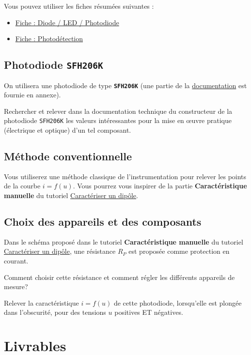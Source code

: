 Vous pouvez utiliser les fiches résumées suivantes : 

\begin{itemize}
	\item \hyperref[fiche:Led]{Fiche : Diode / LED / Photodiode}
	\item \hyperref[fiche:Photodetect]{Fiche : Photodétection}
\end{itemize}


\subsection{Photodiode \texttt{SFH206K}}

On utilisera une photodiode de type \textbf{\texttt{SFH206K}} (une partie de la \hyperref[doc:phdSFH206K]{documentation} est fournie en annexe).

\Quest Rechercher et relever dans la documentation technique du constructeur de la photodiode \texttt{SFH206K} les valeurs intéressantes pour la mise en \oe{}uvre pratique (électrique et optique) d'un tel composant.


\subsection{Méthode conventionnelle}

Vous utiliserez une méthode classique de l'instrumentation pour relever les points de la courbe $i = f(u)$. Vous pourrez vous inspirer de la partie \textbf{Caractéristique manuelle} du tutoriel \hyperref[ressource:CaracStat]{Caractériser un dipôle}.

\subsection{Choix des appareils et des composants}

Dans le schéma proposé dans le tutoriel \textbf{Caractéristique manuelle} du tutoriel \hyperref[ressource:CaracStat]{Caractériser un dipôle}, une résistance $R_P$ est proposée comme protection en courant.

\Quest Comment choisir cette résistance et comment régler les différents appareils de mesure?

\Manip Relever la caractéristique $i=f(u)$ de cette photodiode, lorsqu'elle est plongée dans l'obscurité, pour des tensions $u$ positives ET négatives.


\section{Livrables}


